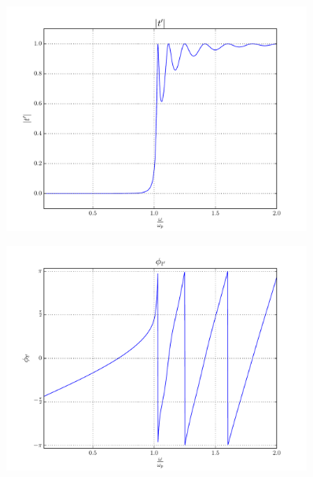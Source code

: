 \documentclass[a4paper,11pt]{article}
\begin{document}
                            \begin{figure}[!ht]
                            \centering \includegraphics[width=0.9\textwidth]{Punto1BC/tp_N.pdf}
                            \end{figure}
                            \begin{figure}[!ht]
                            \centering \includegraphics[width=0.9\textwidth]{Punto1BC/tp_f.pdf}
                            \end{figure}
\end{document}
